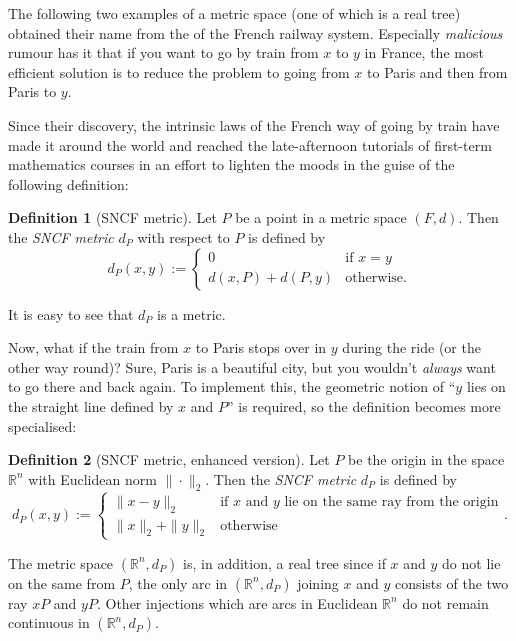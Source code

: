 \documentclass[12pt]{article}
\newcommand{\mbb}{\mathbb}
\begin{document}
The following two examples of a metric space (one of which is a real
tree) obtained their name from the  of the French railway
system. Especially \emph{malicious} rumour has it that if you want to
go by train from $x$ to $y$ in France, the most efficient solution is
to reduce the problem to going from $x$ to Paris and then from Paris
to $y$.

Since their discovery, the intrinsic laws of the French way of going
by train have made it around the world and reached the late-afternoon
tutorials of first-term mathematics courses in an effort to lighten the
moods in the guise of the following definition:
\theoremstyle{definition}
\newtheorem{defn}{Definition}
\begin{defn}[SNCF metric]
Let $P$ be a point in a metric space $(F,d)$. Then the \emph{SNCF
metric} $d_P$ with respect to $P$ is defined by
\begin{equation*}
d_P(x,y):=\begin{cases}
0&\text{if }x=y\\
d(x,P)+d(P,y)&\text{otherwise.}
\end{cases}
\end{equation*}
\end{defn}
It is easy to see that $d_P$ is a metric.

Now, what if the train from $x$ to Paris stops over in $y$ during the
ride (or the other way round)? Sure, Paris is a beautiful city, but
you wouldn't \emph{always} want to go there and back again. To
implement this, the geometric notion of ``$y$ lies on the straight
line defined by $x$ and $P$'' is required, so the definition becomes
more specialised:
\begin{defn}[SNCF metric, enhanced version]
Let $P$ be the origin in the space $\mbb{R}^n$ with Euclidean norm
$\|\cdot\|_2$. Then the \emph{SNCF metric} $d_P$ is defined by
\begin{equation*}
d_P(x,y):=\begin{cases}
\|x-y\|_2&\text{if }x\text{ and }y\text{ lie on the same ray from the origin}\\
\|x\|_2+\|y\|_2&\text{otherwise}
\end{cases}.
\end{equation*}
\end{defn}
The metric space $(\mbb{R}^n,d_P)$ is, in addition, a real tree since
if $x$ and $y$ do not lie on the same  from $P$, the only arc in
$(\mbb{R}^n,d_P)$ joining $x$ and $y$ consists of the two ray 
$xP$ and $yP$. Other injections which are arcs in Euclidean
$\mbb{R}^n$ do not remain continuous in $(\mbb{R}^n,d_P)$.
\end{document}

